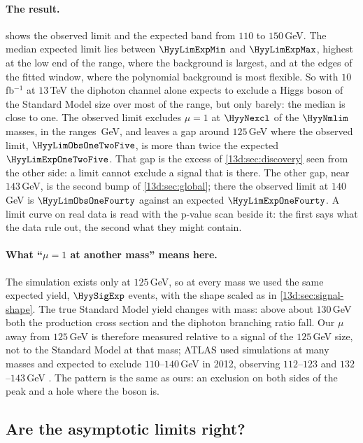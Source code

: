 \paragraph{The result.}
 shows the observed limit and the expected band from $110$ to
$150\,$GeV. The median expected limit lies between $\HyyLimExpMin$ and $\HyyLimExpMax$,
highest at the low end of the range, where the background is largest, and at the edges
of the fitted window, where the polynomial background is most flexible. So with $10\,$fb$^{-1}$
at $13\,$TeV the diphoton channel alone expects to exclude a Higgs boson of the Standard
Model size over most of the range, but only barely: the median is close to one. The
observed limit excludes $\mu=1$ at $\HyyNexcl$ of the $\HyyNmlim$ masses, in the ranges
\HyyExclRanges\,GeV, and leaves a gap around $125\,$GeV where the observed limit,
$\HyyLimObsOneTwoFive$, is more than twice the expected $\HyyLimExpOneTwoFive$. That gap is
the excess of \cref{13d:sec:discovery} seen from the other side: a limit cannot exclude a
signal that is there. The other gap, near $143\,$GeV, is the second bump of
\cref{13d:sec:global}; there the observed limit at $140\,$GeV is $\HyyLimObsOneFourty$
against an expected $\HyyLimExpOneFourty$. A limit curve on real data is read with the
p-value scan beside it: the first says what the data rule out, the second what they
might contain.

\paragraph{What ``$\mu=1$ at another mass'' means here.}
The simulation exists only at $125\,$GeV, so at every mass we used the same expected yield,
$\HyySigExp$ events, with the shape scaled as in \cref{13d:sec:signal-shape}. The true
Standard Model yield changes with mass: above about $130\,$GeV both the production cross
section and the diphoton branching ratio fall. Our $\mu$ away from $125\,$GeV is therefore
measured relative to a signal of the $125\,$GeV size, not to the Standard Model at that
mass; ATLAS used simulations at many masses  and expected to
exclude $110$--$140\,$GeV in 2012, observing $112$--$123$ and $132$--$143\,$GeV
. The pattern is the same as ours: an exclusion on both
sides of the peak and a hole where the boson is.

\subsection{Are the asymptotic limits right?}
\label{13d:sec:cls-toys}

